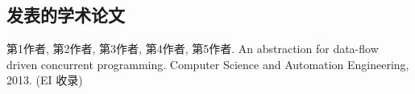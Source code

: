 \begin{resume}

  \section*{发表的学术论文} %

  \begin{enumerate}[{[}1{]}]
  \addtolength{\itemsep}{-.36\baselineskip}%
  \item 第1作者, 第2作者, 第3作者, 第4作者, 第5作者. An abstraction for
    data-flow driven concurrent programming. Computer Science and Automation Engineering,
    2013. (EI 收录)
  \end{enumerate}

\end{resume}
